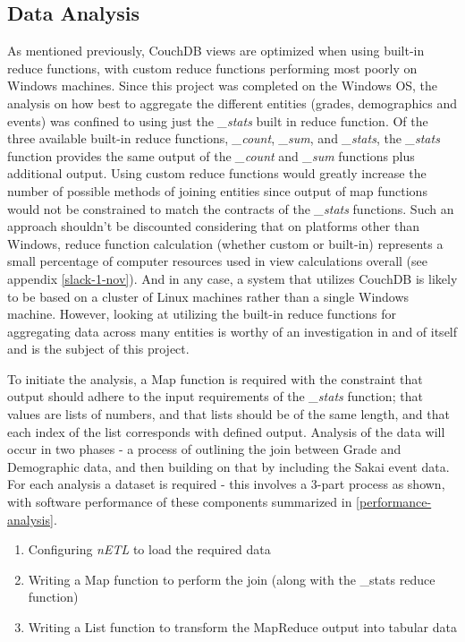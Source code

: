 \subsection{Data Analysis}
As mentioned previously, CouchDB views are optimized when using built-in reduce functions, with custom reduce functions performing most poorly on Windows machines. Since this project was completed on the Windows OS, the analysis on how best to aggregate the different entities (grades, demographics and events) was confined to using just the \textit{\_stats} built in reduce function. Of the three available built-in reduce functions, \textit{\_count}, \textit{\_sum}, and \textit{\_stats}, the \textit{\_stats} function provides the same output of the \textit{\_count} and \textit{\_sum} functions plus additional output. Using custom reduce functions would greatly increase the number of possible methods of joining entities since output of map functions would not be constrained to match the contracts of the \textit{\_stats} functions. Such an approach shouldn't be discounted considering that on platforms other than Windows, reduce function calculation (whether custom or built-in) represents a small percentage of computer resources used in view calculations overall (see appendix \ref{slack-1-nov}). And in any case, a system that utilizes CouchDB is likely to be based on a cluster of Linux machines rather than a single Windows machine. However, looking at utilizing the built-in reduce functions for aggregating data across many entities is worthy of an investigation in and of itself and is the subject of this project.

To initiate the analysis, a Map function is required with the constraint that output should adhere to the input requirements of the \textit{\_stats} function; that values are lists of numbers, and that lists should be of the same length, and that each index of the list corresponds with defined output. Analysis of the data will occur in two phases - a process of outlining the join between Grade and Demographic data, and then building on that by including the Sakai event data. For each analysis a dataset is required - this involves a 3-part process as shown, with software performance of these components summarized in \ref{performance-analysis}.

\begin{enumerate}
    \item Configuring \textit{nETL} to load the required data
    \item Writing a Map function to perform the join (along with the \_stats reduce function)
    \item Writing a List function to transform the MapReduce output into tabular data
\end{enumerate}


